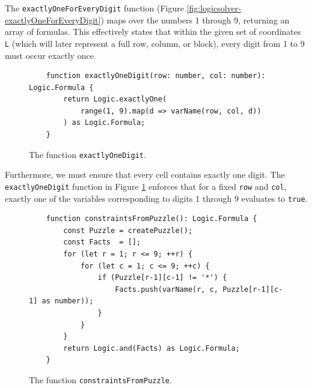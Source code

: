 The \texttt{exactlyOneForEveryDigit} function (Figure \ref{fig:logicsolver-exactlyOneForEveryDigit}) maps over
the numbers 1 through 9, returning an array of formulas. This effectively states that within the given set of
coordinates \texttt{L} (which will later represent a full row, column, or block), every digit from 1 to 9 must
occur exactly once. 

\begin{figure}[!ht]
  \centering
\begin{verbatim}
    function exactlyOneDigit(row: number, col: number): Logic.Formula {
        return Logic.exactlyOne(
            range(1, 9).map(d => varName(row, col, d))
        ) as Logic.Formula;
    }
\end{verbatim}
\vspace*{-0.3cm}
  \caption{The function \texttt{exactlyOneDigit}.}
  \label{fig:logicsolver-exactlyOneDigit}
\end{figure}

Furthermore, we must ensure that every cell contains exactly one digit.  The \texttt{exactlyOneDigit}
function in Figure \ref{fig:logicsolver-exactlyOneDigit} enforces that for a fixed \texttt{row} and
\texttt{col}, exactly one of the variables corresponding to digits 1 through 9 evaluates to \texttt{true}. 



\begin{figure}[!ht]
  \centering
\begin{verbatim}
    function constraintsFromPuzzle(): Logic.Formula {
        const Puzzle = createPuzzle();
        const Facts  = [];
        for (let r = 1; r <= 9; ++r) { 
            for (let c = 1; c <= 9; ++c) {
                if (Puzzle[r-1][c-1] != '*') {
                    Facts.push(varName(r, c, Puzzle[r-1][c-1] as number));
                }
            }
        }
        return Logic.and(Facts) as Logic.Formula;
    }
\end{verbatim}
\vspace*{-0.3cm}
  \caption{The function \texttt{constraintsFromPuzzle}.}
  \label{fig:logicsolver-constraintsFromPuzzle}
\end{figure}

